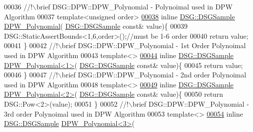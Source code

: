 \begin{DoxyCode}
00036 \textcolor{comment}{        //!\(\backslash\)brief DSG::DPW::DPW\_Polynomial - Polynoimal used in DPW Algorithm}
00037 \textcolor{comment}{}        \textcolor{keyword}{template}<\textcolor{keywordtype}{unsigned} order>
\hypertarget{_d_p_w_8h_source_l00038}{}\hyperlink{namespace_d_s_g_1_1_d_p_w_a1677c6fedac376f3e9b284bc9a4a227c}{00038}         \textcolor{keyword}{inline} \hyperlink{namespace_d_s_g_ac39a94cd27ebcd9c1e7502d0c624894a}{DSG::DSGSample} \hyperlink{namespace_d_s_g_1_1_d_p_w_a1677c6fedac376f3e9b284bc9a4a227c}{DPW\_Polynomial}(
      \hyperlink{namespace_d_s_g_ac39a94cd27ebcd9c1e7502d0c624894a}{DSG::DSGSample} \textcolor{keyword}{const}& value)\{
00039             DSG::StaticAssertBounds<1,6,order>();\textcolor{comment}{//must be 1-6 order}
00040             \textcolor{keywordflow}{return} value;
00041         \}\textcolor{comment}{}
00042 \textcolor{comment}{        //!\(\backslash\)brief DSG::DPW::DPW\_Polynomial - 1st Order Polynoimal used in DPW Algorithm}
00043 \textcolor{comment}{}        \textcolor{keyword}{template}<>
\hypertarget{_d_p_w_8h_source_l00044}{}\hyperlink{namespace_d_s_g_1_1_d_p_w_a8330d5b0b7bdf2247cdd357f9707eaaf}{00044}         \textcolor{keyword}{inline} \hyperlink{namespace_d_s_g_ac39a94cd27ebcd9c1e7502d0c624894a}{DSG::DSGSample} \hyperlink{namespace_d_s_g_1_1_d_p_w_a8330d5b0b7bdf2247cdd357f9707eaaf}{DPW\_Polynomial<1>}(
      \hyperlink{namespace_d_s_g_ac39a94cd27ebcd9c1e7502d0c624894a}{DSG::DSGSample} \textcolor{keyword}{const}& value)\{
00045             \textcolor{keywordflow}{return} value;
00046         \}\textcolor{comment}{}
00047 \textcolor{comment}{        //!\(\backslash\)brief DSG::DPW::DPW\_Polynomial - 2nd order Polynoimal used in DPW Algorithm}
00048 \textcolor{comment}{}        \textcolor{keyword}{template}<>
\hypertarget{_d_p_w_8h_source_l00049}{}\hyperlink{namespace_d_s_g_1_1_d_p_w_a140753401d8518aa64bbcd7496a65b45}{00049}         \textcolor{keyword}{inline} \hyperlink{namespace_d_s_g_ac39a94cd27ebcd9c1e7502d0c624894a}{DSG::DSGSample} \hyperlink{namespace_d_s_g_1_1_d_p_w_a140753401d8518aa64bbcd7496a65b45}{DPW\_Polynomial<2>}(
      \hyperlink{namespace_d_s_g_ac39a94cd27ebcd9c1e7502d0c624894a}{DSG::DSGSample} \textcolor{keyword}{const}& value)\{
00050             \textcolor{keywordflow}{return} DSG::Pow<2>(value);
00051         \}\textcolor{comment}{}
00052 \textcolor{comment}{        //!\(\backslash\)brief DSG::DPW::DPW\_Polynomial - 3rd order Polynoimal used in DPW Algorithm}
00053 \textcolor{comment}{}        \textcolor{keyword}{template}<>
\hypertarget{_d_p_w_8h_source_l00054}{}\hyperlink{namespace_d_s_g_1_1_d_p_w_a6f20dd7808a5e5bf3df682ce92eeb520}{00054}         \textcolor{keyword}{inline} \hyperlink{namespace_d_s_g_ac39a94cd27ebcd9c1e7502d0c624894a}{DSG::DSGSample} \hyperlink{namespace_d_s_g_1_1_d_p_w_a6f20dd7808a5e5bf3df682ce92eeb520}{DPW\_Polynomial<3>}(

\end{DoxyCode}
